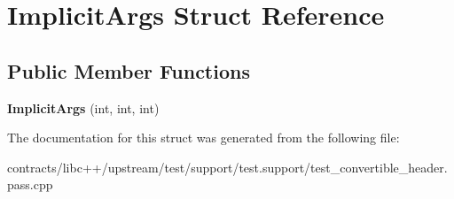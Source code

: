 \hypertarget{struct_implicit_args}{}\section{Implicit\+Args Struct Reference}
\label{struct_implicit_args}
\subsection*{Public Member Functions}
\begin{DoxyCompactItemize}
\item 
\mbox{\label{struct_implicit_args_a23dc5a3932919e360556f6942f5aa399}} 
{\bfseries Implicit\+Args} (int, int, int)
\end{DoxyCompactItemize}


The documentation for this struct was generated from the following file\+:\begin{DoxyCompactItemize}
\item 
contracts/libc++/upstream/test/support/test.\+support/test\+\_\+convertible\+\_\+header.\+pass.\+cpp\end{DoxyCompactItemize}
